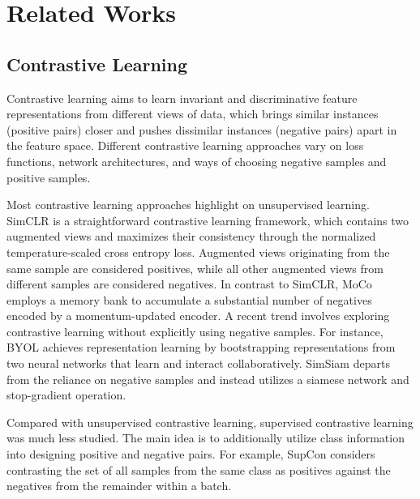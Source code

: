 \section{Related Works}
\label{sect:rw}
\subsection{Contrastive Learning}
Contrastive learning aims to learn invariant and discriminative feature representations from different views of data, which brings similar instances (positive pairs) closer and pushes dissimilar instances (negative pairs) apart in the feature space. Different contrastive learning approaches vary on loss functions, network architectures, and ways of choosing negative samples and positive samples. 

Most contrastive learning approaches highlight on unsupervised learning. SimCLR \cite{simclr2020} is a straightforward contrastive learning framework, which contains two augmented views and maximizes their consistency through the normalized temperature-scaled cross entropy loss. Augmented views originating from the same sample are considered positives, while all other augmented views from different samples are considered negatives. In contrast to SimCLR, MoCo \cite{he2020moco} employs a memory bank to accumulate a substantial number of negatives encoded by a momentum-updated encoder. A recent trend involves exploring contrastive learning without explicitly using negative samples. For instance, BYOL \cite{grill2020BYOL} achieves representation learning by bootstrapping representations from two neural networks that learn and interact collaboratively. SimSiam \cite{chen2021simsiam} departs from the reliance on negative samples and instead utilizes a siamese network and stop-gradient operation.

Compared with unsupervised contrastive learning, supervised contrastive learning was much less studied. The main idea is to additionally utilize class information into designing positive and negative pairs. For example, SupCon \cite{Khosla2020} considers contrasting the set of all samples from the same class as positives against the negatives from the remainder within a batch.

